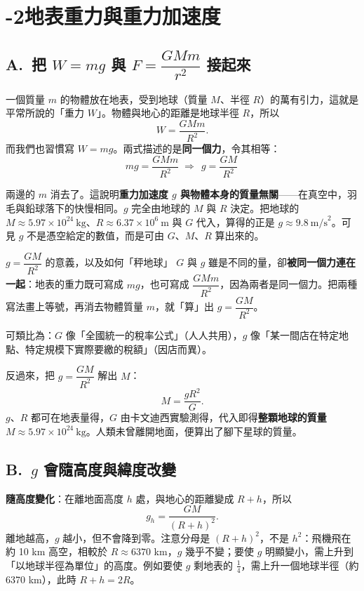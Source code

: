 \documentclass[11pt]{article}
\begin{document}
\section*{-2\quad 地表重力與重力加速度}

\subsection*{\sffamily A.\ 把 $W=mg$ 與 $F=\dfrac{GMm}{r^2}$ 接起來}

一個質量 $m$ 的物體放在地表，受到地球（質量 $M$、半徑 $R$）的萬有引力，這就是平常所說的「重力 $W$」。物體與地心的距離是地球半徑 $R$，所以
$$W=\dfrac{GMm}{R^{2}}.$$
而我們也習慣寫 $W=mg$。兩式描述的是\textbf{同一個力}，令其相等：
$$mg=\dfrac{GMm}{R^{2}}\;\Longrightarrow\;\boxed{\,g=\dfrac{GM}{R^{2}}\,}$$

兩邊的 $m$ 消去了。這說明\textbf{重力加速度 $g$ 與物體本身的質量無關}——在真空中，羽毛與鉛球落下的快慢相同。$g$ 完全由地球的 $M$ 與 $R$ 決定。把地球的 $M\approx5.97\times10^{24}\ \text{kg}$、$R\approx6.37\times10^{6}\ \text{m}$ 與 $G$ 代入，算得的正是 $g\approx9.8\ \text{m/s}^2$。可見 $g$ 不是憑空給定的數值，而是可由 $G$、$M$、$R$ 算出來的。

\begin{補充框}{$g=\dfrac{GM}{R^2}$ 的意義，以及如何「秤地球」}
$G$ 與 $g$ 雖是不同的量，卻\textbf{被同一個力連在一起}：地表的重力既可寫成 $mg$，也可寫成 $\dfrac{GMm}{R^2}$，因為兩者是同一個力。把兩種寫法畫上等號，再消去物體質量 $m$，就「算」出 $g=\dfrac{GM}{R^2}$。

可類比為：$G$ 像「全國統一的稅率公式」（人人共用），$g$ 像「某一間店在特定地點、特定規模下實際要繳的稅額」（因店而異）。

反過來，把 $g=\dfrac{GM}{R^2}$ 解出 $M$：
$$M=\dfrac{gR^{2}}{G}.$$
$g$、$R$ 都可在地表量得，$G$ 由卡文迪西實驗測得，代入即得\textbf{整顆地球的質量} $M\approx5.97\times10^{24}\ \text{kg}$。人類未曾離開地面，便算出了腳下星球的質量。
\end{補充框}

\subsection*{\sffamily B.\ $g$ 會隨高度與緯度改變}

\textbf{隨高度變化}：在離地面高度 $h$ 處，與地心的距離變成 $R+h$，所以
$$g_h=\dfrac{GM}{(R+h)^{2}}.$$
離地越高，$g$ 越小，但不會降到零。注意分母是 $(R+h)^2$，不是 $h^2$：飛機飛在約 10 km 高空，相較於 $R\approx6370$ km，$g$ 幾乎不變；要使 $g$ 明顯變小，需上升到「以地球半徑為單位」的高度。例如要使 $g$ 剩地表的 $\tfrac14$，需上升一個地球半徑（約 6370 km），此時 $R+h=2R$。
\end{document}
